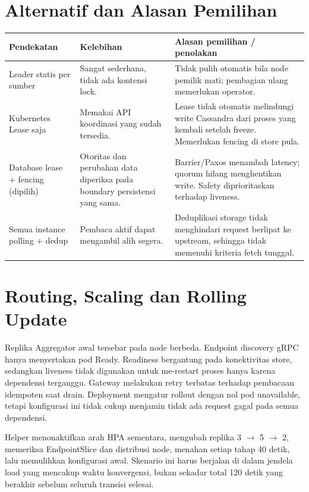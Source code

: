 \section{Alternatif dan Alasan Pemilihan}
\begin{longtable}{@{}P{3.6cm}P{5.3cm}P{6.6cm}@{}}
\toprule Pendekatan & Kelebihan & Alasan pemilihan / penolakan\\\midrule\endhead
Leader statis per sumber & Sangat sederhana, tidak ada kontensi lock. & Tidak pulih otomatis bila node pemilik mati; pembagian ulang memerlukan operator.\\
Kubernetes Lease saja & Memakai API koordinasi yang sudah tersedia. & Lease tidak otomatis melindungi write Cassandra dari proses yang kembali setelah freeze. Memerlukan fencing di store pula.\\
Database lease + fencing (dipilih) & Otoritas dan perubahan data diperiksa pada boundary persistensi yang sama. & Barrier/Paxos menambah latency; quorum hilang menghentikan write. Safety diprioritaskan terhadap liveness.\\
Semua instance polling + dedup & Pembaca aktif dapat mengambil alih segera. & Deduplikasi storage tidak menghindari request berlipat ke upstream, sehingga tidak memenuhi kriteria fetch tunggal.\\\bottomrule
\end{longtable}

\section{Routing, Scaling dan Rolling Update}
Replika Aggregator awal tersebar pada node berbeda. Endpoint discovery gRPC hanya menyertakan pod Ready. Readiness bergantung pada konektivitas store, sedangkan liveness tidak digunakan untuk me-restart proses hanya karena dependensi terganggu. Gateway melakukan retry terbatas terhadap pembacaan idempoten saat drain. Deployment mengatur rollout dengan nol pod unavailable, tetapi konfigurasi ini tidak cukup menjamin tidak ada request gagal pada semua dependensi.

Helper  menonaktifkan arah HPA sementara, mengubah replika 3 $\rightarrow$ 5 $\rightarrow$ 2, memeriksa EndpointSlice dan distribusi node, menahan setiap tahap 40 detik, lalu memulihkan konfigurasi awal. Skenario ini harus berjalan di dalam jendela load yang mencakup waktu konvergensi, bukan sekadar total 120 detik yang berakhir sebelum seluruh transisi selesai.

